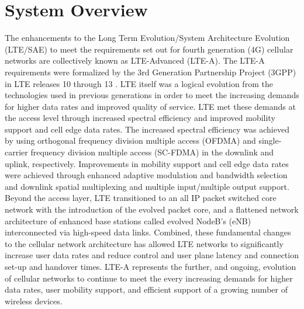 \section{System Overview}
\label{sys-overview}
The enhancements to the Long Term Evolution/System Architecture Evolution (LTE/SAE) to meet the requirements set out for fourth generation (4G) cellular networks are collectively known as LTE-Advanced (LTE-A).  The LTE-A requirements were formalized by the 3rd Generation Partnership Project (3GPP) in LTE releases 10 through 13 \cite{tr36913}.  LTE itself was a logical evolution from the technologies used in previous generations in order to meet the increasing demands for higher data rates and improved quality of service. LTE met these demands at the access level through increased spectral efficiency and improved mobility support and cell edge data rates.  The increased spectral efficiency was achieved by using orthogonal frequency division multiple access (OFDMA) and single-carrier frequency division multiple access (SC-FDMA) in the downlink and uplink, respectively.  Improvements in mobility support and cell edge data rates were achieved through enhanced adaptive modulation and bandwidth selection and downlink spatial multiplexing and multiple input/multiple output support.  Beyond the access layer, LTE transitioned to an all IP packet switched core network with the introduction of the evolved packet core, and a flattened network architecture of enhanced base stations called evolved NodeB's (eNB) interconnected via high-speed data links.  Combined, these fundamental changes to the cellular network architecture has allowed LTE networks to significantly increase user data rates and reduce control and user plane latency and connection set-up and handover times.  LTE-A represents the further, and ongoing, evolution of cellular networks to continue to meet the every increasing demands for higher data rates, user mobility support, and efficient support of a growing number of wireless devices.

